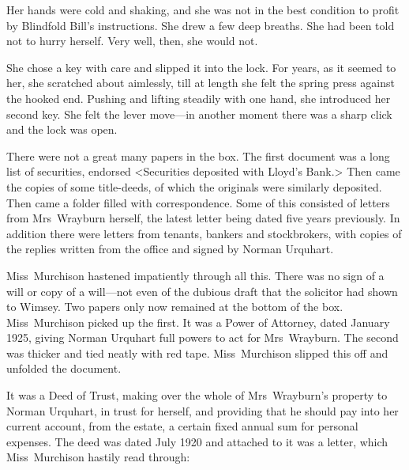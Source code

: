 Her hands were cold and shaking, and she was not in the best condition to profit by Blindfold Bill's instructions. She drew a few deep breaths. She had been told not to hurry herself. Very well, then, she would not.

She chose a key with care and slipped it into the lock. For years, as it seemed to her, she scratched about aimlessly, till at length she felt the spring press against the hooked end. Pushing and lifting steadily with one hand, she introduced her second key. She felt the lever move—in another moment there was a sharp click and the lock was open.

There were not a great many papers in the box. The first document was a long list of securities, endorsed <Securities deposited with Lloyd's Bank.> Then came the copies of some title-deeds, of which the originals were similarly deposited. Then came a folder filled with correspondence. Some of this consisted of letters from Mrs~Wrayburn herself, the latest letter being dated five years previously. In addition there were letters from tenants, bankers and stockbrokers, with copies of the replies written from the office and signed by Norman Urquhart.

Miss~Murchison hastened impatiently through all this. There was no sign of a will or copy of a will—not even of the dubious draft that the solicitor had shown to Wimsey. Two papers only now remained at the bottom of the box. Miss~Murchison picked up the first. It was a Power of Attorney, dated January 1925, giving Norman Urquhart full powers to act for Mrs~Wrayburn. The second was thicker and tied neatly with red tape. Miss~Murchison slipped this off and unfolded the document.

It was a Deed of Trust, making over the whole of Mrs~Wrayburn's property to Norman Urquhart, in trust for herself, and providing that he should pay into her current account, from the estate, a certain fixed annual sum for personal expenses. The deed was dated July 1920 and attached to it was a letter, which Miss~Murchison hastily read through:

